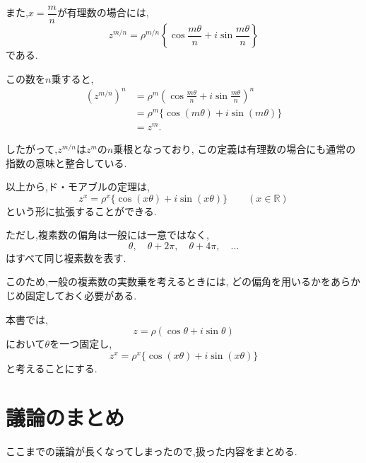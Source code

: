   また,$x=\dfrac{m}{n}$が有理数の場合には,
  \[
    z^{m/n}
    =
    \rho^{m/n}
    \left\{
      \cos\frac{m\theta}{n}
      +i\sin\frac{m\theta}{n}
    \right\}
  \]
  である.

  この数を$n$乗すると,
  \begin{align*}
    \left(
      z^{m/n}
    \right)^n
    &=
    \rho^m
    \left(
      \cos\frac{m\theta}{n}
      +i\sin\frac{m\theta}{n}
    \right)^n\\
    &=
    \rho^m
    \{
      \cos(m\theta)
      +i\sin(m\theta)
    \}\\
    &=
    z^m.
  \end{align*}

  したがって,$z^{m/n}$は$z^m$の$n$乗根となっており,
  この定義は有理数の場合にも通常の指数の意味と整合している.

  以上から,ド・モアブルの定理は,
  \[
    z^x
    =
    \rho^x
    \{
      \cos(x\theta)+i\sin(x\theta)
    \}
    \qquad(x\in\mathbb R)
  \]
  という形に拡張することができる.

  ただし,複素数の偏角は一般には一意ではなく,
  \[
    \theta,\quad
    \theta+2\pi,\quad
    \theta+4\pi,\quad\ldots
  \]
  はすべて同じ複素数を表す.

  このため,一般の複素数の実数乗を考えるときには,
  どの偏角を用いるかをあらかじめ固定しておく必要がある.

  本書では,
  \[
    z
    =
    \rho(
      \cos\theta+i\sin\theta
    )
  \]
  において$\theta$を一つ固定し,
  \[
    z^x
    =
    \rho^x
    \{
      \cos(x\theta)+i\sin(x\theta)
    \}
  \]
  と考えることにする.
\section{議論のまとめ}
  ここまでの議論が長くなってしまったので,扱った内容をまとめる.
  
